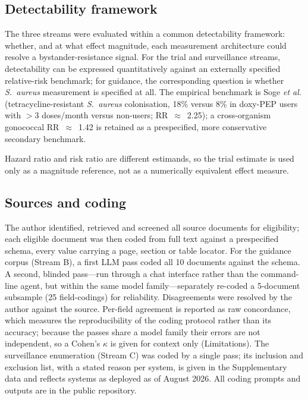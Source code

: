 \documentclass[12pt,a4paper]{article}
\newcommand{\sa}{\emph{S.~aureus}}
\begin{document}
\subsection*{Detectability framework}
The three streams were evaluated within a common detectability framework:
whether, and at what effect magnitude, each measurement architecture could
resolve a bystander-resistance signal. For the trial and surveillance streams,
detectability can be expressed quantitatively against an externally specified
relative-risk benchmark; for guidance, the corresponding question is whether
\sa{} measurement is specified at all. The empirical benchmark is Soge
\textit{et al.}\cite{soge2025} (tetracycline-resistant \sa{} colonisation,
18\% versus 8\% in doxy-PEP users with $>$3 doses/month versus non-users;
RR~$\approx$~2.25); a cross-organism gonococcal RR~$\approx$~1.42 is retained
as a prespecified, more conservative secondary benchmark.

Hazard ratio and risk ratio are different estimands, so the trial estimate is
used only as a magnitude reference, not as a numerically equivalent effect
measure.

\subsection*{Sources and coding}
The author identified, retrieved and screened all source documents for
eligibility; each eligible document was then coded from full text against a
prespecified schema, every value carrying a page, section or table locator. For
the guidance corpus (Stream B), a first LLM pass coded all 10 documents against
the schema. A second, blinded pass---run through a chat interface rather than the
command-line agent, but within the same model family---separately re-coded a
5-document subsample (25 field-codings) for reliability. Disagreements were
resolved by the author against the source. Per-field agreement is reported as raw
concordance, which measures the reproducibility of the coding protocol rather than
its accuracy; because the passes share a model family their errors are not
independent, so a Cohen's $\kappa$ is given for context only (Limitations). The surveillance enumeration (Stream C) was
coded by a single pass; its inclusion and exclusion list, with a stated reason
per system, is given in the Supplementary data and reflects systems as deployed
as of August 2026. All coding prompts and outputs are in the public repository.
\end{document}
